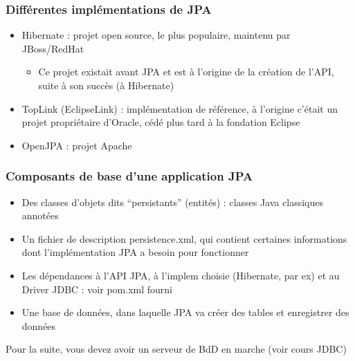 \documentclass[aspectratio=169,10pt]{beamer}
\begin{document}
\begin{frame}
	\frametitle{Différentes implémentations de JPA}
	
	\begin{itemize}
		\item Hibernate : projet open source, le plus populaire, maintenu par JBoss/RedHat
		\begin{itemize}
			\item Ce projet existait avant JPA et est à l'origine de la création de l'API, suite à son succès (à Hibernate)
		\end{itemize}
		\item TopLink (EclipseLink) : implémentation de référence, à l'origine c'était un projet propriétaire d'Oracle, cédé plus tard à la fondation Eclipse
		\item OpenJPA : projet Apache
	\end{itemize}
\end{frame}


\begin{frame}
	\frametitle{Composants de base d'une application JPA}
	
	\begin{itemize}
		\item  Des classes d'objets dits ``persistants'' (entités) : classes Java classiques annotées 
		\item Un fichier de description persistence.xml, qui contient certaines informations dont l'implémentation JPA a besoin pour fonctionner
		\item Les dépendances à l'API JPA, à l'implem choisie (Hibernate, par ex) et au Driver JDBC : voir pom.xml fourni
		\item Une base de données, dans laquelle JPA va créer des tables et enregistrer des données
	\end{itemize}
	Pour la suite, vous devez avoir un serveur de BdD en marche (voir cours JDBC)	
\end{frame}
\end{document}
